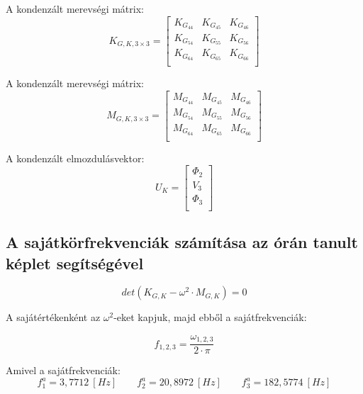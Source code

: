 \documentclass{article}
\begin{document}
		A kondenzált merevségi mátrix: 
		\begin{equation}
			K_{G,K,3\times3}=
			\begin{bmatrix}
			 K_{G_{44}}	 & K_{G_{45}}	 & K_{G_{46}}   \\
			 K_{G_{54}}	 & K_{G_{55}}	 & K_{G_{56}}   \\
			 K_{G_{64}}	 & K_{G_{65}}	 & K_{G_{66}}   \\
			\end{bmatrix}
		\end{equation}
		
		A kondenzált merevségi mátrix: 
		\begin{equation}
			M_{G,K,3\times3}=
			\begin{bmatrix}
			 M_{G_{44}}	 & M_{G_{45}}	 & M_{G_{46}}   \\
			 M_{G_{54}}	 & M_{G_{55}}	 & M_{G_{56}}   \\
			 M_{G_{64}}	 & M_{G_{65}}	 & M_{G_{66}}   \\
			\end{bmatrix}
		\end{equation}
		
		A kondenzált elmozdulásvektor:
		\begin{equation}
			U_K=
			\begin{bmatrix}
				\Phi_{2} \\
				V_{3}    \\
				\Phi_{3} \\
			\end{bmatrix}
		\end{equation} 
	
	\subsection{A sajátkörfrekvenciák számítása az órán tanult képlet segítségével}
	
		\begin{equation}
			det(K_{G,K} - \omega^2 \cdot M_{G,K}) = 0
		\end{equation}
		
		A sajátértékenként az $\omega^2$-eket kapjuk, majd ebből a sajátfrekvenciák:
		
		\begin{equation}
			f_{1,2,3}=\frac{\omega_{1,2,3}}{2\cdot \pi}
		\end{equation}
		
		Amivel a sajátfrekvenciák:	
		\[f_1^a=3,7712~[Hz] \qquad f_2^a=20,8972~[Hz] \qquad f_3^a=182,5774~[Hz]  \]
		
\end{document}
